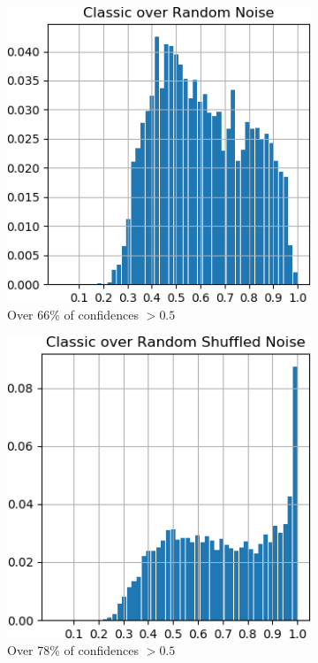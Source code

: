 \documentclass[12pt,oneside]{CUNY_PhD}
\begin{document}
\begin{figure}[!htbp]
    \centering
    \begin{subfigure}[t]{0.49\textwidth}
        \includegraphics[width=\textwidth]{images/mnist-behavior/classic-hist-random.png}
        \caption*{Over 66\% of confidences $>0.5$}
    \end{subfigure}
    \begin{subfigure}[t]{0.49\textwidth}
        \includegraphics[width=\textwidth]{images/mnist-behavior/classic-hist-shuffled.png}
        \caption*{Over 78\% of confidences $>0.5$}
    \end{subfigure}
    \caption{}
    \label{fig:classic-hists}
\end{figure}
\end{document}
